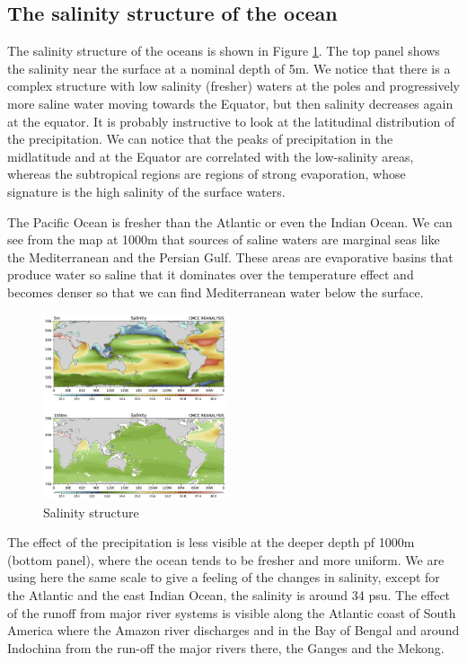 \subsection{The salinity structure of the ocean }
The salinity structure of the oceans is shown in Figure \ref{fig:fig1}.  The top panel shows the salinity near the surface at a nominal depth of
5m. We notice that there is a complex structure with low salinity
(fresher) waters at the poles and progressively more saline water moving towards the Equator, but then salinity decreases again at the equator. It is probably instructive to look at the latitudinal distribution of the precipitation. We can notice that the peaks of precipitation in the midlatitude and at the Equator are correlated with the low-salinity areas, whereas the subtropical regions are regions of strong evaporation, whose signature is the high salinity of the surface waters.

The Pacific Ocean is fresher than the Atlantic or even the Indian Ocean.
We can see from the map at 1000m that sources of saline waters are
marginal seas like the Mediterranean and the Persian Gulf. These areas
are evaporative basins that produce water so saline that it dominates
over the temperature effect and becomes denser so that we can find
Mediterranean water below the surface.
\begin{figure}
	\begin{center}
		\includegraphics[width=0.48\textwidth]{upload/26image.png}
	\end{center}
	\caption{Salinity structure}
	\label{fig:fig1}
\end{figure}


The effect of the precipitation is less visible at the deeper depth pf
1000m (bottom panel), where the ocean tends to be fresher and more
uniform. We are using here the same scale to give a feeling of the
changes in salinity, except for the Atlantic and the east Indian Ocean,
the salinity is around 34 psu.
The effect of the runoff from major river systems is visible along the
Atlantic coast of South America where the Amazon river discharges and in the Bay of Bengal and around Indochina from the run-off the major rivers there, the Ganges and the Mekong.


